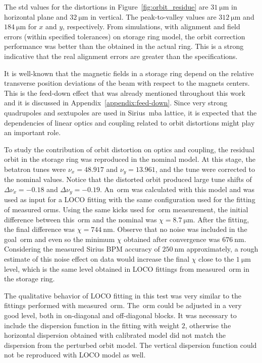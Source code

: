 The std values for the distortions in Figure~\ref{fig:orbit_residue} are $\SI{31}{\micro\meter}$ in horizontal plane and $\SI{32}{\micro\meter}$ in vertical. The peak-to-valley values are $\SI{312}{\micro\meter}$ and $\SI{184}{\micro\meter}$ for $x$ and $y$, respectively. From simulations, with alignment and field errors (within specified tolerances) on storage ring model, the orbit correction performance was better than the obtained in the actual ring. This is a strong indicative that the real alignment errors are greater than the specifications.

It is well-known that the magnetic fields in a storage ring depend on the relative transverse position deviations of the beam with respect to the magnets centers. This is the feed-down effect that was already mentioned throughout this work and it is discussed in Appendix~\ref{appendix:feed-down}. Since very strong quadrupoles and sextupoles are used in Sirius~\gls{mba} lattice, it is expected that the dependencies of linear optics and coupling related to orbit distortions might play an important role.

To study the contribution of orbit distortion on optics and coupling, the residual orbit in the storage ring was reproduced in the nominal model. At this stage, the betatron tunes were $\nu_x = 48.917$ and $\nu_y = 13.961$, and the tune were corrected to the nominal values. Notice that the distorted orbit produced large tune shifts of $\Delta \nu_x = -0.18$ and $\Delta \nu_y = -0.19$. An~\gls{orm} was calculated with this model and was used as input for a LOCO fitting with the same configuration used for the fitting of measured \gls{orm}s. Using the same kicks used for~\gls{orm} measurement, the initial difference between this~\gls{orm} and the nominal was $\chi = \SI{8.7}{\micro\meter}$. After the fitting, the final difference was $\chi = \SI{744}{\nano\meter}$. Observe that no noise was included in the goal~\gls{orm} and even so the minimum $\chi$ obtained after convergence was $\SI{676}{\nano\meter}$. Considering the measured Sirius BPM accuracy of $\SI{250}{\nano\meter}$ approximately, a rough estimate of this noise effect on data would increase the final $\chi$ close to the $\SI{1}{\micro\meter}$ level, which is the same level obtained in LOCO fittings from measured~\gls{orm} in the storage ring.

The qualitative behavior of LOCO fitting in this test was very similar to the fittings performed with measured~\gls{orm}. The~\gls{orm} could be adjusted in a very good level, both in on-diagonal and off-diagonal blocks. It was necessary to include the dispersion function in the fitting with weight $2$, otherwise the horizontal dispersion obtained with calibrated model did not match the dispersion from the perturbed orbit model. The vertical dispersion function could not be reproduced with LOCO model as well. 

